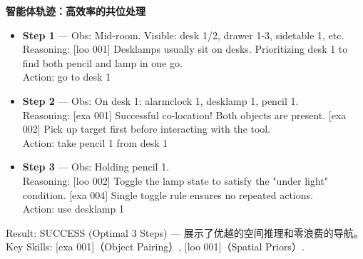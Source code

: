 \documentclass[11pt,UTF8,fontset=fandol]{ctexart}
\begin{document}
\textbf{智能体轨迹：高效率的共位处理}
\begin{itemize}[leftmargin=1.5em,itemsep=0.2em]
\item \textbf{Step 1} — Obs: Mid-room. Visible: desk 1/2, drawer 1-3, sidetable 1, etc.\\
  Reasoning: [loo 001] Desklamps usually sit on desks. Prioritizing desk 1 to find both pencil and lamp in one go.\\
  Action: go to desk 1
\item \textbf{Step 2} — Obs: On desk 1: alarmclock 1, desklamp 1, pencil 1.\\
  Reasoning: [exa 001] Successful co-location! Both objects are present. [exa 002] Pick up target first before interacting with the tool.\\
  Action: take pencil 1 from desk 1
\item \textbf{Step 3} — Obs: Holding pencil 1.\\
  Reasoning: [loo 002] Toggle the lamp state to satisfy the "under light" condition. [exa 004] Single toggle rule ensures no repeated actions.\\
  Action: use desklamp 1
\end{itemize}
Result: SUCCESS (Optimal 3 Steps) — 展示了优越的空间推理和零浪费的导航。Key Skills: [exa 001]（Object Pairing）, [loo 001]（Spatial Priors）.
\end{document}
